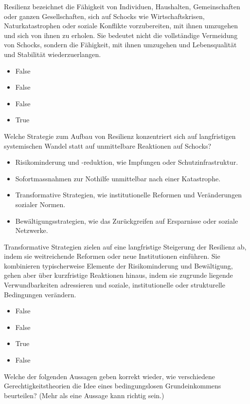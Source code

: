 \documentclass[
  nswissgerman,
  a4paper,
  openany]{book}
\providecommand{\tightlist}{%
  \setlength{\itemsep}{0pt}\setlength{\parskip}{0pt}}
\begin{document}
Resilienz bezeichnet die Fähigkeit von Individuen, Haushalten,
Gemeinschaften oder ganzen Gesellschaften, sich auf Schocks wie
Wirtschaftskrisen, Naturkatastrophen oder soziale Konflikte
vorzubereiten, mit ihnen umzugehen und sich von ihnen zu erholen. Sie
bedeutet nicht die vollständige Vermeidung von Schocks, sondern die
Fähigkeit, mit ihnen umzugehen und Lebensqualität und Stabilität
wiederzuerlangen.

\begin{itemize}
\tightlist
\item
  False
\item
  False
\item
  False
\item
  True
\end{itemize}

Welche Strategie zum Aufbau von Resilienz konzentriert sich auf
langfristigen systemischen Wandel statt auf unmittelbare Reaktionen auf
Schocks?

\begin{itemize}
\tightlist
\item[$\square$]
  Risikominderung und -reduktion, wie Impfungen oder
  Schutzinfrastruktur.
\item[$\square$]
  Sofortmassnahmen zur Nothilfe unmittelbar nach einer Katastrophe.
\item[$\square$]
  Transformative Strategien, wie institutionelle Reformen und
  Veränderungen sozialer Normen.
\item[$\square$]
  Bewältigungsstrategien, wie das Zurückgreifen auf Ersparnisse oder
  soziale Netzwerke.
\end{itemize}

Transformative Strategien zielen auf eine langfristige Steigerung der
Resilienz ab, indem sie weitreichende Reformen oder neue Institutionen
einführen. Sie kombinieren typischerweise Elemente der Risikominderung
und Bewältigung, gehen aber über kurzfristige Reaktionen hinaus, indem
sie zugrunde liegende Verwundbarkeiten adressieren und soziale,
institutionelle oder strukturelle Bedingungen verändern.

\begin{itemize}
\tightlist
\item
  False
\item
  False
\item
  True
\item
  False
\end{itemize}

Welche der folgenden Aussagen geben korrekt wieder, wie verschiedene
Gerechtigkeitstheorien die Idee eines bedingungslosen Grundeinkommens
beurteilen? (Mehr als eine Aussage kann richtig sein.)
\end{document}
